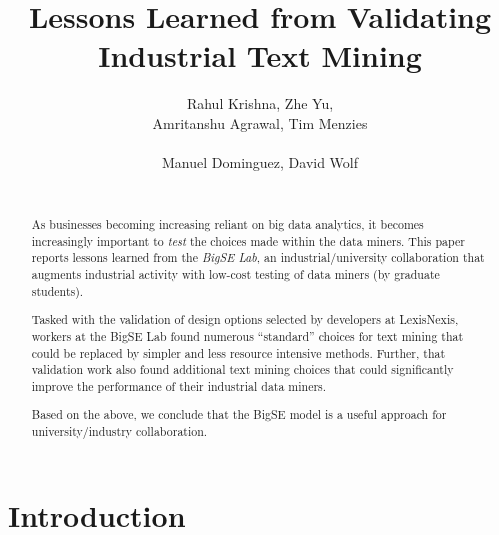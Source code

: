 \documentclass{sig-alternate-05-2015}
\begin{document}

\title{Lessons Learned from Validating  Industrial Text Mining  }
\author{
\alignauthor
Rahul Krishna,  Zhe Yu, \\ Amritanshu Agrawal, Tim Menzies\\ %
       \\
\alignauthor
Manuel Dominguez,  David Wolf \\%
       \\
}
\maketitle


\begin{abstract}

As businesses becoming increasing reliant on big data   analytics, it becomes
increasingly important to {\em test} the choices made within the data miners.
This paper reports   lessons learned from the  {\em BigSE Lab}, an industrial/university
collaboration that augments industrial activity with low-cost testing
of data miners (by  graduate students).  

Tasked with the validation of design options selected by developers at LexisNexis, workers
at the BigSE Lab found numerous ``standard'' choices for
text mining that could be replaced by  simpler and less resource intensive methods. Further, that validation work also found additional text mining choices   that could significantly improve the performance of their
industrial data miners.

Based on the above, we conclude that the BigSE model is a useful approach for university/industry collaboration.

\end{abstract}



\section{Introduction}
\end{document}
